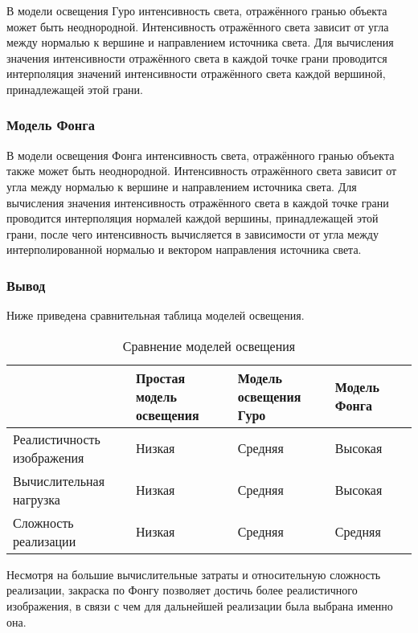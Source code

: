 В модели освещения Гуро интенсивность света, отражённого гранью объекта может быть неоднородной.
Интенсивность отражённого света зависит от угла между нормалью к вершине и направлением источника света.
Для вычисления значения интенсивности отражённого света в каждой точке грани проводится интерполяция значений интенсивности отражённого света каждой вершиной, принадлежащей этой грани.

\subsubsection{Модель Фонга}

В модели освещения Фонга интенсивность света, отражённого гранью объекта также может быть неоднородной.
Интенсивность отражённого света зависит от угла между нормалью к вершине и направлением источника света.
Для вычисления значения интенсивность отражённого света в каждой точке грани проводится интерполяция нормалей каждой вершины, принадлежащей этой грани, после чего интенсивность вычисляется в зависимости от угла между интерполированной нормалью и вектором направления источника света.

\subsubsection*{Вывод}

Ниже приведена сравнительная таблица моделей освещения.

\noindent
\begin{table}[H]
    \caption{Сравнение моделей освещения}
    \label{tab:lighting-models}
\begin{adjustbox}{width=1\textwidth}
    \begin{tabular}{|p{}|p{}|p{}|p{}|p{}|}
        \hline
        &
        Простая модель освещения
        &
        Модель освещения Гуро
        &
        Модель Фонга
        \\
        \hline
        Реалистичность изображения
        &
        Низкая
        &
        Средняя
        &
        Высокая
        \\
        \hline
        Вычислительная нагрузка
        &
        Низкая
        &
        Средняя
        &
        Высокая
        \\
        \hline
        Сложность реализации
        &
        Низкая
        &
        Средняя
        &
        Средняя
        \\
        \hline
    \end{tabular}
\end{adjustbox}
\end{table}

Несмотря на большие вычислительные затраты и относительную сложность реализации, закраска по Фонгу позволяет достичь более реалистичного изображения, в связи с чем для дальнейшей реализации была выбрана именно она.
